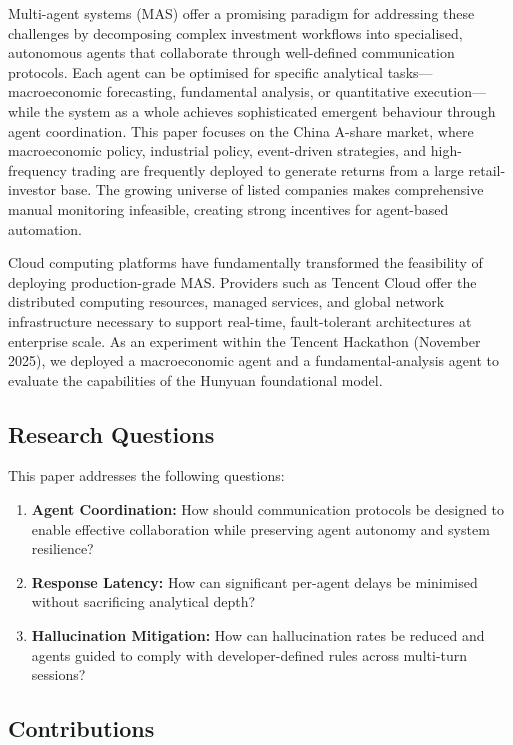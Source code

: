 \documentclass[11pt,a4paper]{article}
\begin{document}
Multi-agent systems (MAS) offer a promising paradigm for addressing
these challenges by decomposing complex investment workflows into
specialised, autonomous agents that collaborate through well-defined
communication protocols. Each agent can be optimised for specific
analytical tasks---macroeconomic forecasting, fundamental analysis, or
quantitative execution---while the system as a whole achieves
sophisticated emergent behaviour through agent coordination. This paper
focuses on the China A-share market, where macroeconomic policy,
industrial policy, event-driven strategies, and high-frequency trading
are frequently deployed to generate returns from a large retail-investor
base. The growing universe of listed companies makes comprehensive
manual monitoring infeasible, creating strong incentives for
agent-based automation.

Cloud computing platforms have fundamentally transformed the feasibility
of deploying production-grade MAS. Providers such as Tencent Cloud offer
the distributed computing resources, managed services, and global
network infrastructure necessary to support real-time, fault-tolerant
architectures at enterprise scale. As an experiment within the Tencent
Hackathon (November 2025), we deployed a macroeconomic agent and a fundamental-analysis
agent to evaluate the capabilities of the Hunyuan foundational model.

\subsection*{Research Questions}

This paper addresses the following questions:

\begin{enumerate}[label=\textbf{RQ\arabic*.}]
  \item \textbf{Agent Coordination:} How should communication protocols
        be designed to enable effective collaboration while preserving
        agent autonomy and system resilience?
  \item \textbf{Response Latency:} How can significant per-agent delays
        be minimised without sacrificing analytical depth?
  \item \textbf{Hallucination Mitigation:} How can hallucination rates
        be reduced and agents guided to comply with developer-defined
        rules across multi-turn sessions?
\end{enumerate}

\subsection*{Contributions}
\end{document}
